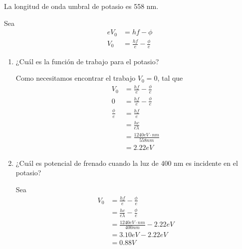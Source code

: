 \begin{problema}
    [Problema 9]  La longitud de onda umbral de potasio es 558 nm.
    \begin{cajita}
        Sea 
        \begin{align*}
            eV_0 &= hf-\phi\\
            V_0&= \frac{hf}{e}-\frac{\phi}{e}
        \end{align*}
        
    \end{cajita}
    \begin{enumerate}
        \item ¿Cuál es la función de trabajo para el potasio?
        \begin{sol}
            Como necesitamos encontrar el trabajo $V_0=0$, tal que 
            \begin{align*}
                V_0&= \frac{hf}{e}-\frac{\phi}{e}\\
                0 &= \frac{hf}{e}-\frac{\phi}{e}\\
                \frac{\phi}{e} &= \frac{hf}{e}\\
                &= \frac{hc}{e\lambda}\\
                &= \frac{1240 eV\cdot nm}{558nm}\\
                &= 2.22eV
                        \end{align*}
        \end{sol} 
        \item ¿Cuál es potencial de frenado cuando la luz de 400 nm es incidente en el potasio?
        \begin{sol}
            Sea 
            \begin{align*}
                V_0&= \frac{hf}{e}-\frac{\phi}{e}\\
                   &= \frac{hc}{e\lambda}-\frac{\phi}{e}\\
                   &= \frac{1240 eV\cdot nm }{400 nm} -2.22 eV\\
                   &= 3.10eV - 2.22eV\\
                   &= 0.88V
            \end{align*}
        \end{sol} 
    \end{enumerate}
    
\end{problema}
